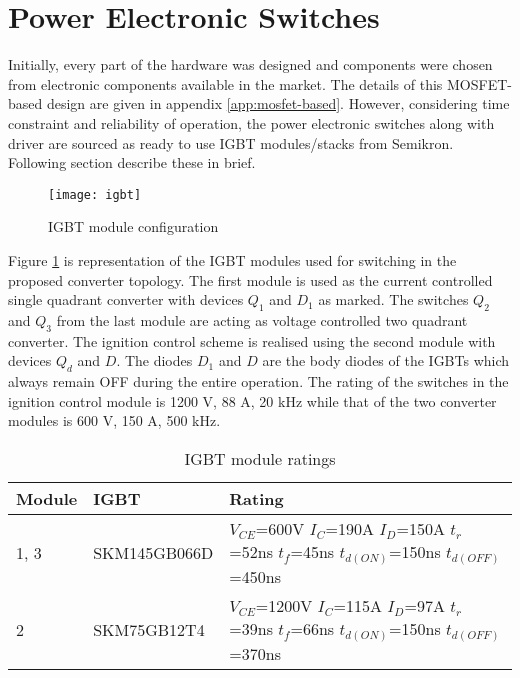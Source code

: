 \section{Power Electronic Switches}
	Initially, every part of the hardware was designed and components were chosen from electronic components available in the market. The details of this MOSFET-based design are given in appendix \ref{app:mosfet-based}. However, considering time constraint and reliability of operation, the power electronic switches along with driver are sourced as ready to use IGBT modules/stacks from Semikron. Following section describe these in brief.
	\begin{figure}[h]
        \centering
        \texttt{[image: igbt]}
        \caption{IGBT module configuration}
        \label{fig:igbt}
    \end{figure}
    Figure \ref{fig:igbt} is representation of the IGBT modules used for switching in the proposed converter topology. The first module is used as the current controlled single quadrant converter with devices $Q_1$ and $D_1$ as marked. The switches $Q_2$ and $Q_3$ from the last module are acting as voltage controlled two quadrant converter. The ignition control scheme is realised using the second module with devices $Q_d$ and $D$. The diodes $D_1$ and $D$ are the body diodes of the IGBTs which always remain OFF during the entire operation. The rating of the switches in the ignition control module is 1200 V, 88 A, 20 kHz while that of the two converter modules is 600 V, 150 A, 500 kHz.
	\begin{table}[h]
		\centering
		\begin{tabular}{| l | l | p{4cm} |} \hline
			\textbf{Module} & \textbf{IGBT} & \textbf{Rating} \\ \hline
			1, 3 & SKM145GB066D & \parbox[t]{4cm}{$V_{CE}$=600V \\ $I_{C}$=190A \\ $I_D$=150A \\ $t_r$=52ns \\ $t_f$=45ns \\ $t_{d(ON)}$=150ns \\ $t_{d(OFF)}$=450ns} \vspace{-1mm} \\  & SKM75GB12T4 & \parbox[t]{4cm}{$V_{CE}$=1200V \\ $I_{C}$=115A \\ $I_D$=97A \\ $t_r$=39ns \\ $t_f$=66ns \\ $t_{d(ON)}$=150ns \\ $t_{d(OFF)}$=370ns} \vspace{-1mm} \\ \hline
		\end{tabular}
		\caption{IGBT module ratings}
		\label{tab:igbt}
	\end{table}

